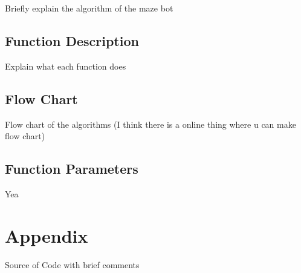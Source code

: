 \documentclass[11pt]{article}
\begin{document}
Briefly explain the algorithm of the maze bot 

\subsection{Function Description}

Explain what each function does 

\subsection{Flow Chart}

Flow chart of the algorithms (I think there is a online thing where u can make flow chart)

\subsection{Function Parameters}

Yea

\newpage

\section{Appendix}

Source of Code with brief comments
\end{document}
